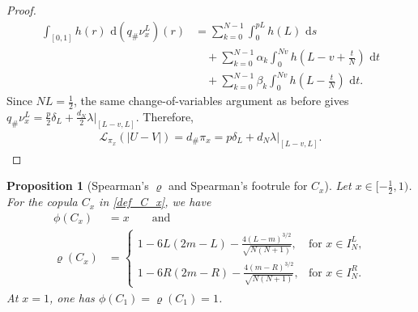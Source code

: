 \documentclass{article}
\newtheorem{proposition}[theorem]{Proposition}
\newcommand{\de}{\mathrm{\,d}}
\newcommand{\lam}{\lambda}
\begin{document}
\begin{proof}
\begin{align*}
    \int_{[0,1]}h(r)\,\de(q_\#\nu_x^L)(r)
    &=
    \sum_{k=0}^{N-1}\int_0^{pL}h(L)\,\de s\\
    &\quad+
    \sum_{k=0}^{N-1}\alpha_k
    \int_0^{Nv}h(L-v+\tfrac{t}{N})\,\de t\\
    &\quad+
    \sum_{k=0}^{N-1}\beta_k
    \int_0^{Nv}h(L-\tfrac{t}{N})\,\de t.
\end{align*}
Since \(NL=\frac12\), the same change-of-variables argument as before gives \(q_\#\nu_x^L = \frac{p}{2}\delta_L + \frac{d_N}{2}\lam\vert_{[L-v,L]}. \) Therefore,
\begin{align*}
    \mathcal L_{\pi_x}(|U-V|)
    = d_\#\pi_x
    =
    p\delta_L+d_N\lam\vert_{[L-v,L]}.
\end{align*}
\end{proof}




\begin{proposition}[Spearman's \(\varrho\) and Spearman's footrule for \(C_x\)]\label{prop_C_x}
Let \(x\in [-\frac 1 2,1)\).
For the copula \(C_x\) in \eqref{def_C_x}, we have
    \begin{align*}
    \phi(C_x) &= x \qquad \text{and}\\
         \varrho(C_x) &= \begin{cases}
             1-6L(2m-L) - \frac{4(L-m)^{3/2}}{\sqrt{N (N+1)}}, & \text{for } x\in I_N^L,\\
             1-6R(2m-R) - \frac{4(m-R)^{3/2}}{\sqrt{N (N+1)}}, & \text{for } x\in I_N^R.
         \end{cases}
    \end{align*}
    At \(x=1\), one has \(\phi(C_1)=\varrho(C_1)=1\).
\end{proposition}
\end{document}
